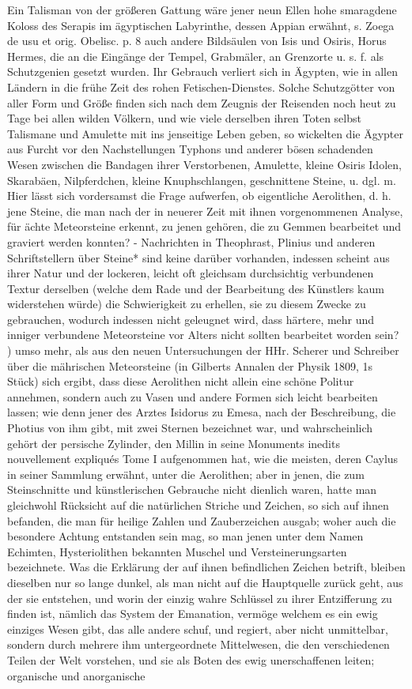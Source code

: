 \documentclass[a4paper, 11pt, oneside, polutonikogreek, german]{article}
\begin{document}
Ein Talisman von der größeren Gattung wäre jener neun Ellen hohe smaragdene Koloss des Serapis im ägyptischen Labyrinthe, dessen Appian erwähnt, s. Zoega de usu et orig. Obelisc. p. 8 auch andere Bildsäulen von Isis und Osiris, Horus Hermes, die an die Eingänge der Tempel, Grabmäler, an Grenzorte u. s. f. als Schutzgenien gesetzt wurden. Ihr Gebrauch verliert sich in Ägypten, wie in allen Ländern in die frühe Zeit des rohen Fetischen-Dienstes. Solche Schutzgötter von aller Form und Größe finden sich nach dem Zeugnis der Reisenden noch heut zu Tage bei allen wilden Völkern, und wie viele derselben ihren Toten selbst Talismane und Amulette mit ins jenseitige Leben geben, so wickelten die Ägypter aus Furcht vor den Nachstellungen Typhons und anderer bösen schadenden Wesen zwischen die Bandagen ihrer Verstorbenen, Amulette, kleine Osiris Idolen, Skarabäen, Nilpferdchen, kleine Knuphschlangen, geschnittene Steine, u. dgl. m. Hier lässt sich vordersamst die Frage aufwerfen, ob eigentliche Aerolithen, d. h. jene Steine, die man nach der in neuerer Zeit mit ihnen vorgenommenen Analyse, für ächte Meteorsteine erkennt, zu jenen gehören, die zu Gemmen bearbeitet und graviert werden konnten? - Nachrichten in Theophrast, Plinius und anderen Schriftstellern über Steine* sind keine darüber vorhanden, indessen scheint aus ihrer Natur und der lockeren, leicht oft gleichsam durchsichtig verbundenen Textur derselben (welche dem Rade und der Bearbeitung des Künstlers kaum widerstehen würde) die Schwierigkeit zu erhellen, sie zu diesem Zwecke zu gebrauchen, wodurch indessen nicht geleugnet wird, dass härtere, mehr und inniger verbundene Meteorsteine vor Alters nicht sollten bearbeitet worden sein? ) umso mehr, als aus den neuen Untersuchungen der HHr. Scherer und Schreiber über die mährischen Meteorsteine (in Gilberts Annalen der Physik 1809, 1s Stück) sich ergibt, dass diese Aerolithen nicht allein eine schöne Politur annehmen, sondern auch zu Vasen und andere Formen sich leicht bearbeiten lassen; wie denn jener des Arztes Isidorus zu Emesa, nach der Beschreibung, die Photius von ihm gibt, mit zwei Sternen bezeichnet war, und wahrscheinlich gehört der persische Zylinder, den Millin in seine Monuments inedits nouvellement expliqués Tome I aufgenommen hat, wie die meisten, deren Caylus in seiner Sammlung erwähnt, unter die Aerolithen; aber in jenen, die zum Steinschnitte und künstlerischen Gebrauche nicht dienlich waren, hatte man gleichwohl Rücksicht auf die natürlichen Striche und Zeichen, so sich auf ihnen befanden, die man für heilige Zahlen und Zauberzeichen ausgab; woher auch die besondere Achtung entstanden sein mag, so man jenen unter dem Namen Echimten, Hysteriolithen bekannten Muschel und Versteinerungsarten bezeichnete. Was die Erklärung der auf ihnen befindlichen Zeichen betrift, bleiben dieselben nur so lange dunkel, als man nicht auf die Hauptquelle zurück geht, aus der sie entstehen, und worin der einzig wahre Schlüssel zu ihrer Entzifferung zu finden ist, nämlich das System der Emanation, vermöge welchem es ein ewig einziges Wesen gibt, das alle andere schuf, und regiert, aber nicht unmittelbar, sondern durch mehrere ihm untergeordnete Mittelwesen, die den verschiedenen Teilen der Welt vorstehen, und sie als Boten des ewig unerschaffenen leiten; organische und anorganische 
\end{document}
